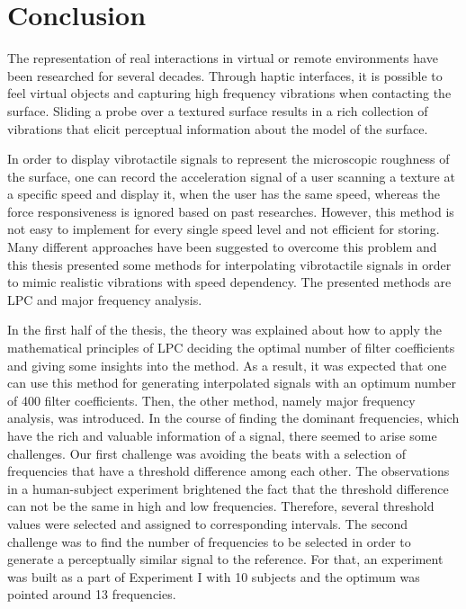 \chapter{Conclusion}
\thispagestyle{empty}%
The representation of real interactions in virtual or remote environments have been researched for several decades. Through haptic interfaces, it is possible to feel virtual objects and capturing high frequency vibrations when contacting the surface. Sliding a probe over a textured surface results in a rich collection of vibrations that elicit perceptual information about the model of the surface.

In order to display vibrotactile signals to represent the microscopic roughness of the surface, one can record the acceleration signal of a user scanning a texture at a specific speed and display it, when the user has the same speed, whereas the force responsiveness is ignored based on past researches. However, this method is not easy to implement for every single speed level and not efficient for storing. Many different approaches have been suggested to overcome this problem and this thesis presented some methods for interpolating vibrotactile signals in order to mimic realistic vibrations with speed dependency. The presented methods are LPC and major frequency analysis.

In the first half of the thesis, the theory was explained about how to apply the mathematical principles of LPC deciding the optimal number of filter coefficients and giving some insights into the method. As a result, it was expected that one can use this method for generating interpolated signals with an optimum number of 400 filter coefficients. Then, the other method, namely major frequency analysis, was introduced. In the course of finding the dominant frequencies, which have the rich and valuable information of a signal, there seemed to arise some challenges. Our first challenge was avoiding the beats with a selection of frequencies that have a threshold difference among each other. The observations in a human-subject experiment brightened the fact that the threshold difference can not be the same in high and low frequencies. Therefore, several threshold values were selected and assigned to corresponding intervals. The second challenge was to find the number of frequencies to be selected in order to generate a perceptually similar signal to the reference. For that, an experiment was built as a part of Experiment I with 10 subjects and the optimum was pointed around 13 frequencies.

